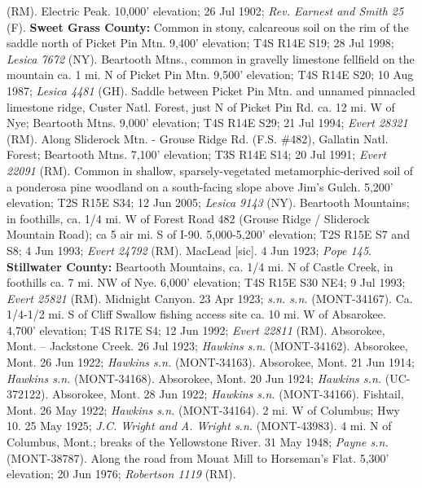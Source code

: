 (RM).  Electric Peak. 10,000’ elevation; 26 Jul 1902; \textit{Rev. Earnest and Smith 25} (F).  \textbf{Sweet Grass County:}  Common in stony, calcareous soil on the rim of the saddle north of Picket Pin Mtn. 9,400’ elevation; T4S R14E S19; 28 Jul 1998; \textit{Lesica 7672} (NY).  Beartooth Mtns., common in gravelly limestone fellfield on the mountain ca. 1 mi. N of Picket Pin Mtn. 9,500’ elevation; T4S R14E S20; 10 Aug 1987; \textit{Lesica 4481} (GH).  Saddle between Picket Pin Mtn. and unnamed pinnacled limestone ridge, Custer Natl. Forest, just N of Picket Pin Rd. ca. 12 mi. W of Nye; Beartooth Mtns. 9,000’ elevation; T4S R14E S29; 21 Jul 1994; \textit{Evert 28321} (RM).  Along Sliderock Mtn. - Grouse Ridge Rd. (F.S. \#482), Gallatin Natl. Forest; Beartooth Mtns. 7,100’ elevation; T3S R14E S14; 20 Jul 1991; \textit{Evert 22091} (RM).  Common in shallow, sparsely-vegetated metamorphic-derived soil of a ponderosa pine woodland on a south-facing slope above Jim's Gulch. 5,200’ elevation; T2S R15E S34; 12 Jun 2005; \textit{Lesica 9143} (NY).  Beartooth Mountains; in foothills, ca. 1/4 mi. W of Forest Road 482 (Grouse Ridge / Sliderock Mountain Road); ca 5 air mi. S of I-90. 5,000-5,200’ elevation; T2S R15E S7 and S8; 4 Jun 1993; \textit{Evert 24792} (RM).  MacLead [sic]. 4 Jun 1923; \textit{Pope 145}.  \textbf{Stillwater County:}  Beartooth Mountains, ca. 1/4 mi. N of Castle Creek, in foothills ca. 7 mi. NW of Nye. 6,000’ elevation; T4S R15E S30 NE4; 9 Jul 1993; \textit{Evert 25821} (RM).  Midnight Canyon. 23 Apr 1923; \textit{s.n. s.n.} (MONT-34167).  Ca. 1/4-1/2 mi. S of Cliff Swallow fishing access site ca. 10 mi. W of Absarokee. 4,700’ elevation; T4S R17E S4; 12 Jun 1992; \textit{Evert 22811} (RM).  Absorokee, Mont. – Jackstone Creek. 26 Jul 1923; \textit{Hawkins s.n.} (MONT-34162).  Absorokee, Mont. 26 Jun 1922; \textit{Hawkins s.n.} (MONT-34163).  Absorokee, Mont. 21 Jun 1914; \textit{Hawkins s.n.} (MONT-34168).  Absorokee, Mont.  20 Jun 1924; \textit{Hawkins s.n.} (UC-372122).  Absorokee, Mont. 28 Jun 1922; \textit{Hawkins s.n.} (MONT-34166).  Fishtail, Mont. 26 May 1922; \textit{Hawkins s.n.} (MONT-34164).  2 mi. W of Columbus; Hwy 10. 25 May 1925; \textit{J.C. Wright and A. Wright s.n.} (MONT-43983).  4 mi. N of Columbus, Mont.; breaks of the Yellowstone River. 31 May 1948; \textit{Payne s.n.} (MONT-38787).  Along the road from Mouat Mill to Horseman’s Flat. 5,300’ elevation; 20 Jun 1976; \textit{Robertson 1119} (RM).  

